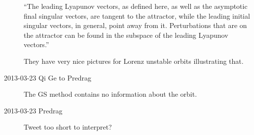 \begin{description}
``The leading Lyapunov vectors, as defined here, as well as the
asymptotic final singular vectors, are tangent to the attractor,
while the leading initial singular vectors, in general, point away
from it. Perturbations that are on the attractor can be found in the
subspace of the leading Lyapunov vectors.''

They have very nice pictures for Lorenz unstable orbits illustrating that.






\item[2013-03-23 Qi Ge to Predrag]
The
GS method contains no information about the orbit.
\item[2013-03-23 Predrag]
Tweet too short to interpret?

\end{description}

\renewcommand{\ssp}{a}
